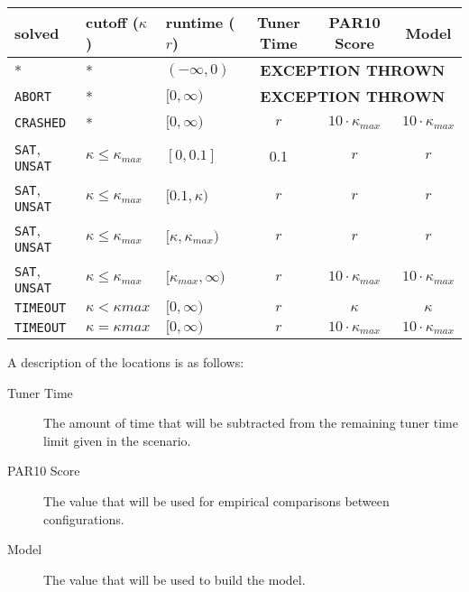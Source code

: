\documentclass[manual.tex]{subfiles}
\begin{document}
\begin{center}
\begin{tabular}{|l | l | l  ||  c | c | c |}
\hline
\textbf{solved} & \textbf{cutoff} ($\kappa$) & \textbf{runtime} ($r$) & Tuner Time & PAR10 Score & Model \\
\hline
\hline
* & *  & $(-\infty, 0)$ & \multicolumn{3}{c|}{\textbf{EXCEPTION THROWN}} \\ %
\hline
\texttt{ABORT} &  *  & $[0, \infty)$  & \multicolumn{3}{c|}{\textbf{EXCEPTION THROWN}} \\ %
\hline
\texttt{CRASHED} & *  & $[0, \infty)$ & $r$ & $10\cdot\kappa_{max}$ & $10\cdot\kappa_{max}$ \\ %
\hline
{\texttt{SAT}, \texttt{UNSAT}} & $\kappa\leq\kappa_{max}$  & $[0,0.1]$ & 0.1 & $r$ & $r$ \\ %
\hline
{\texttt{SAT}, \texttt{UNSAT}} & $\kappa\leq\kappa_{max}$ & $[0.1,\kappa)$ & $r$ & $r$ & $r$ \\ %
\hline
{\texttt{SAT}, \texttt{UNSAT}} & $\kappa\leq\kappa_{max}$ & $[\kappa, \kappa_{max})$ & $r$ & $r$ & $r$ \\ %
\hline
{\texttt{SAT}, \texttt{UNSAT}} & $\kappa\leq\kappa_{max}$ & $[\kappa_{max},\infty)$ & $r$  & $10\cdot\kappa_{max}$ & $10\cdot\kappa_{max}$ \\ %

\hline
{\texttt{TIMEOUT}} & $\kappa<\kappa{max}$ & $[0,\infty)$ & $r$ & $\kappa$ & $\kappa$ \\ %
\hline
{\texttt{TIMEOUT}} & $\kappa=\kappa{max}$ & $[0,\infty)$ & $r$  & $10\cdot\kappa_{max}$ & $10\cdot\kappa_{max}$\\
\hline
\end{tabular}
\end{center}

A description of the locations is as follows:

\begin{description}
\item[Tuner Time] The amount of time that will be subtracted from the remaining tuner time limit given in the scenario.
\item[PAR10 Score] The value that will be used for empirical comparisons between configurations.
\item[Model] 	The value that will be used to build the model.
\end{description}
\end{document}
